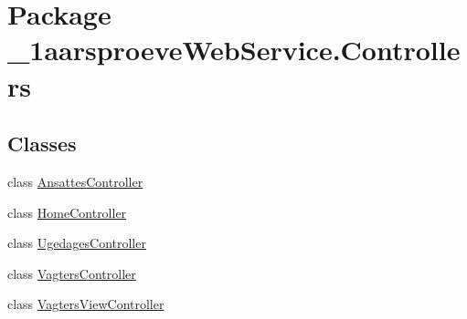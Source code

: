 \hypertarget{namespace__1aarsproeve_web_service_1_1_controllers}{}\section{Package \+\_\+1aarsproeve\+Web\+Service.\+Controllers}
\label{namespace__1aarsproeve_web_service_1_1_controllers}
\subsection*{Classes}
\begin{DoxyCompactItemize}
\item 
class \hyperlink{class__1aarsproeve_web_service_1_1_controllers_1_1_ansattes_controller}{Ansattes\+Controller}
\item 
class \hyperlink{class__1aarsproeve_web_service_1_1_controllers_1_1_home_controller}{Home\+Controller}
\item 
class \hyperlink{class__1aarsproeve_web_service_1_1_controllers_1_1_ugedages_controller}{Ugedages\+Controller}
\item 
class \hyperlink{class__1aarsproeve_web_service_1_1_controllers_1_1_vagters_controller}{Vagters\+Controller}
\item 
class \hyperlink{class__1aarsproeve_web_service_1_1_controllers_1_1_vagters_view_controller}{Vagters\+View\+Controller}
\end{DoxyCompactItemize}
